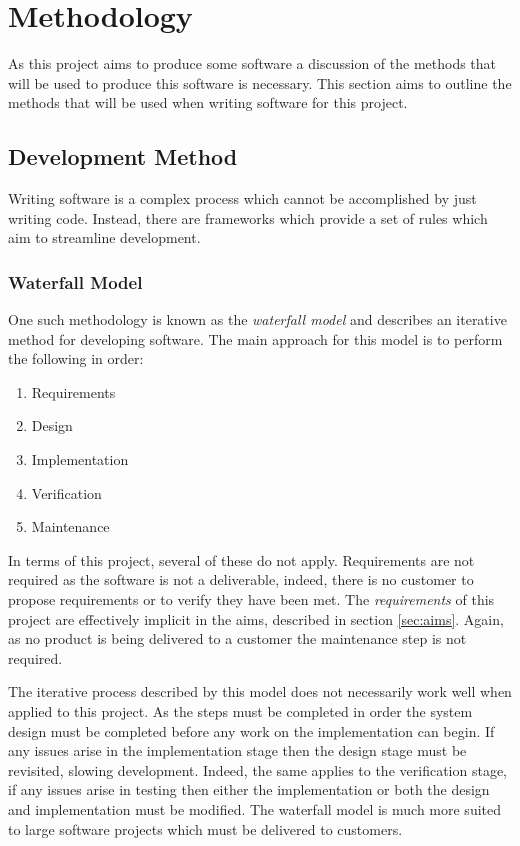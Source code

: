 \chapter{Methodology}

As this project aims to produce some software a discussion of the methods that will be used to produce this software is necessary. This section aims to outline the methods that will be used when writing software for this project.

\section{Development Method}
Writing software is a complex process which cannot be accomplished by just writing code. Instead, there are frameworks which provide a set of rules which aim to streamline development. 

\subsection{Waterfall Model}
One such methodology is known as the \textit{waterfall model} \cite{royce_managing_1970} and describes an iterative method for developing software. The main approach for this model is to perform the following in order:

\begin{enumerate}
	\item{Requirements}
	\item{Design}
	\item{Implementation}
	\item{Verification}
	\item{Maintenance}
\end{enumerate}

In terms of this project, several of these do not apply. Requirements are not required as the software is not a deliverable, indeed, there is no customer to propose requirements or to verify they have been met. The \textit{requirements} of this project are effectively implicit in the aims, described in section \ref{sec:aims}. Again, as no product is being delivered to a customer the maintenance step is not required. 

The iterative process described by this model does not necessarily work well when applied to this project. As the steps must be completed in order the system design must be completed before any work on the implementation can begin. If any issues arise in the implementation stage then the design stage must be revisited, slowing development. Indeed, the same applies to the verification stage, if any issues arise in testing then either the implementation or both the design and implementation must be modified. The waterfall model is much more suited to large software projects which must be delivered to customers.

